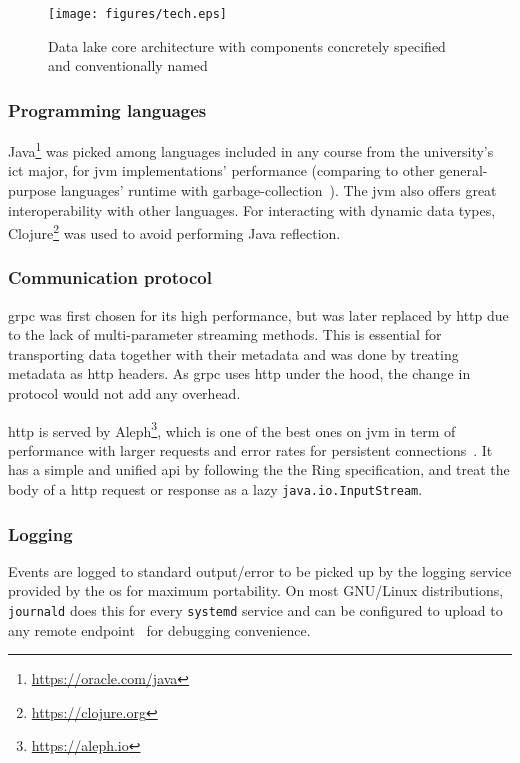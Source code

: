 \begin{figure}\centering
  \texttt{[image: figures/tech.eps]}
  \caption{Data lake core architecture with components concretely specified
    and conventionally named}
  \label{tech}
\end{figure}

\subsubsection{Programming languages}
Java\footnote{\url{https://oracle.com/java}} was picked among languages
included in any course from the university's \gls{ict} major, for \gls{jvm}
implementations' performance (comparing to other general-purpose languages'
runtime with garbage-collection~\cite{game}).  The \gls{jvm} also offers
great interoperability with other languages.  For interacting with dynamic data
types, Clojure\footnote{\url{https://clojure.org}} was used to avoid
performing Java reflection.

\subsubsection{Communication protocol}
\gls{grpc} was first chosen for its high performance, but was later replaced
by \gls{http} due to the lack of multi-parameter streaming methods.  This is
essential for transporting data together with their metadata and was done
by treating metadata as \gls{http} headers.  As \gls{grpc} uses \gls{http}
under the hood, the change in protocol would not add any overhead.

\gls{http} is served by Aleph\footnote{\url{https://aleph.io}},
which is one of the best ones on \gls{jvm} in term of performance
with larger requests and error rates for persistent connections~\cite{aleph}.
It has a simple and unified \gls{api} by following the the Ring specification,
and treat the body of a \gls{http} request or response
as a lazy \verb|java.io.InputStream|.

\subsubsection{Logging}
Events are logged to standard output/error to be picked up
by the logging service provided by the \gls{os} for maximum portability.
On most GNU/Linux distributions, \verb|journald| does this
for every \verb|systemd| service and can be configured to upload
to any remote endpoint~\cite{journal} for debugging convenience.

